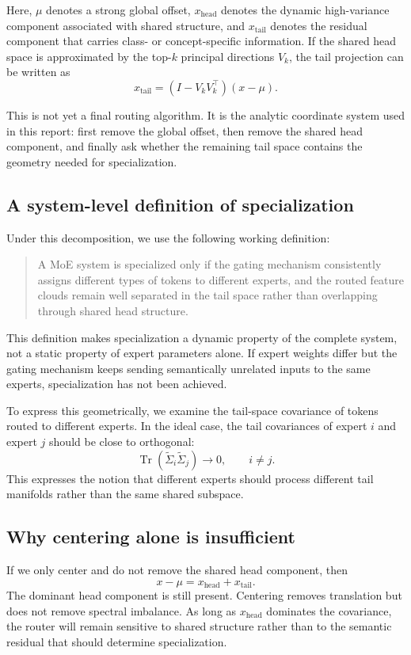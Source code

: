\documentclass[11pt]{article}
\begin{document}
Here, $\mu$ denotes a strong global offset, $x_{\mathrm{head}}$ denotes the dynamic high-variance component associated with shared structure, and $x_{\mathrm{tail}}$ denotes the residual component that carries class- or concept-specific information. If the shared head space is approximated by the top-$k$ principal directions $V_k$, the tail projection can be written as
\[
x_{\mathrm{tail}} = (I - V_k V_k^\top)(x - \mu).
\]

This is not yet a final routing algorithm. It is the analytic coordinate system used in this report: first remove the global offset, then remove the shared head component, and finally ask whether the remaining tail space contains the geometry needed for specialization.

\subsection{A system-level definition of specialization}

Under this decomposition, we use the following working definition:
\begin{quote}
A MoE system is specialized only if the gating mechanism consistently assigns different types of tokens to different experts, and the routed feature clouds remain well separated in the tail space rather than overlapping through shared head structure.
\end{quote}

This definition makes specialization a dynamic property of the complete system, not a static property of expert parameters alone. If expert weights differ but the gating mechanism keeps sending semantically unrelated inputs to the same experts, specialization has not been achieved.

To express this geometrically, we examine the tail-space covariance of tokens routed to different experts. In the ideal case, the tail covariances of expert $i$ and expert $j$ should be close to orthogonal:
\[
\operatorname{Tr}(\widetilde{\Sigma}_i \widetilde{\Sigma}_j) \rightarrow 0,\qquad i \neq j.
\]
This expresses the notion that different experts should process different tail manifolds rather than the same shared subspace.

\subsection{Why centering alone is insufficient}

If we only center and do not remove the shared head component, then
\[
x - \mu = x_{\mathrm{head}} + x_{\mathrm{tail}}.
\]
The dominant head component is still present. Centering removes translation but does not remove spectral imbalance. As long as $x_{\mathrm{head}}$ dominates the covariance, the router will remain sensitive to shared structure rather than to the semantic residual that should determine specialization.
\end{document}
